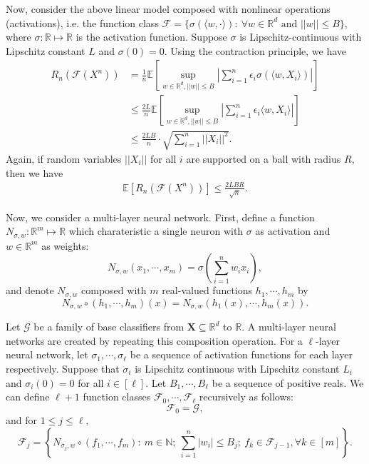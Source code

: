 \documentclass[12pt]{llncs}
\newcommand{\E}[1]{\mathbb{E}\left[#1\right]}
\newcommand{\F}{\mathcal{F}}
\newcommand{\reals}{\mathbb{R}}
\newcommand{\X}{\mathbf{X}}
\begin{document}
Now, consider the above linear model composed with nonlinear operations (activations), i.e. the function class $\F = \{\sigma(\langle w, \cdot \rangle) :\ \forall w \in \reals^d\text{ and }||w|| \leq B\}$, where $\sigma : \reals \mapsto \reals$ is the activation function. Suppose $\sigma$ is Lipschitz-continuous with Lipschitz constant $L$ and $\sigma(0) = 0$. Using the contraction principle, we have
\begin{align*}
  R_n(\F(X^n)) &= \frac{1}{n}\E{\sup\limits_{w \in \reals^d, ||w|| \leq B} \left| \sum_{i=1}^{n} \epsilon_i \sigma(\langle w, X_i \rangle) \right|}\\ &\leq \frac{2L}{n}\E{\sup\limits_{w \in \reals^d, ||w|| \leq B} \left| \sum_{i=1}^{n} \epsilon_i \langle w, X_i \rangle \right|}\\ &\leq \frac{2LB}{n} \cdot \sqrt{\sum_{i=1}^{n} \left|\left| X_i \right|\right|^2}.
\end{align*}
Again, if random variables $||X_i||$ for all $i$ are supported on a ball with radius $R$, then we have
\begin{align}
  \E{R_n(\F(X^n))} \leq \frac{2LBR}{\sqrt{n}}.
\end{align}

Now, we consider a multi-layer neural network. First, define a function $N_{\sigma, w}: \reals^m \mapsto \reals$ which charateristic a single neuron with $\sigma$ as activation and $w \in \reals^m$ as weights: $$N_{\sigma, w}(x_1, \cdots, x_m) = \sigma(\sum_{i=1}^{n}w_i x_i),$$ and denote $N_{\sigma, w}$ composed with $m$ real-valued functions $h_1, \cdots, h_m$ by $$N_{\sigma, w} \circ (h_1, \cdots, h_m)(x) = N_{\sigma, w}(h_1(x), \cdots, h_m(x)).$$

Let $\mathcal{G}$ be a family of base classifiers from $\X \subseteq \reals^d$ to $\reals$. A multi-layer neural networks are created by repeating this composition operation. For a $\ell$-layer neural network, let $\sigma_1, \cdots, \sigma_\ell$ be a sequence of activation functions for each layer respectively. Suppose that $\sigma_i$ is Lipschitz continuous with Lipschitz constant $L_i$ and $\sigma_i(0) = 0$ for all $i \in [\ell]$. Let $B_1, \cdots, B_\ell$ be a sequence of positive reals. We can define $\ell+1$ function classes $\F_0, \cdots, \F_\ell$ recursively as follows: $$\F_0 = \mathcal{G},$$ and for $1 \leq j \leq \ell,$ $$\F_j = \left\{N_{\sigma_j, w} \circ (f_1, \cdots, f_m) :\ m \in \mathbb{N};\ \sum_{i=1}^{n} |w_i| \leq B_j;\ f_k \in \F_{j-1}, \forall k \in [m]\right\}.$$
\end{document}
